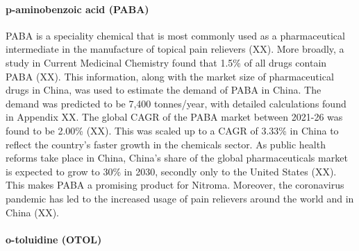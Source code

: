 \paragraph{p-aminobenzoic acid (PABA)}
PABA is a speciality chemical that is most commonly used as a pharmaceutical intermediate in the manufacture of topical pain relievers (XX). More broadly, a study in Current Medicinal Chemistry found that 1.5\% of all drugs contain PABA (XX). This information, along with the market size of pharmaceutical drugs in China, was used to estimate the demand of PABA in China. The demand was predicted to be 7,400 tonnes/year, with detailed calculations found in Appendix XX. The global CAGR of the PABA market between 2021-26 was found to be 2.00\% (XX). This was scaled up to a CAGR of 3.33\% in China to reflect the country’s faster growth in the chemicals sector. As public health reforms take place in China, China’s share of the global pharmaceuticals market is expected to grow to 30\% in 2030, secondly only to the United States (XX). This makes PABA a promising product for Nitroma. Moreover, the coronavirus pandemic has led to the increased usage of pain relievers around the world and in China (XX).

\paragraph{o-toluidine (OTOL)}